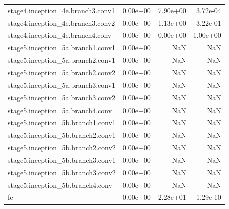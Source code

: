 \begin{longtable}{lrrr}
stage4.inception_4e.branch3.conv1 & 0.00e+00 & 7.90e+00 & 3.72e-04 \\
stage4.inception_4e.branch3.conv2 & 0.00e+00 & 1.13e+00 & 3.22e-01 \\
stage4.inception_4e.branch4.conv & 0.00e+00 & 0.00e+00 & 1.00e+00 \\
stage5.inception_5a.branch1.conv1 & 0.00e+00 & NaN & NaN \\
stage5.inception_5a.branch2.conv1 & 0.00e+00 & NaN & NaN \\
stage5.inception_5a.branch2.conv2 & 0.00e+00 & NaN & NaN \\
stage5.inception_5a.branch3.conv1 & 0.00e+00 & NaN & NaN \\
stage5.inception_5a.branch3.conv2 & 0.00e+00 & NaN & NaN \\
stage5.inception_5a.branch4.conv & 0.00e+00 & NaN & NaN \\
stage5.inception_5b.branch1.conv1 & 0.00e+00 & NaN & NaN \\
stage5.inception_5b.branch2.conv1 & 0.00e+00 & NaN & NaN \\
stage5.inception_5b.branch2.conv2 & 0.00e+00 & NaN & NaN \\
stage5.inception_5b.branch3.conv1 & 0.00e+00 & NaN & NaN \\
stage5.inception_5b.branch3.conv2 & 0.00e+00 & NaN & NaN \\
stage5.inception_5b.branch4.conv & 0.00e+00 & NaN & NaN \\
fc & 0.00e+00 & 2.28e+01 & 1.29e-10 \\
\end{longtable}
